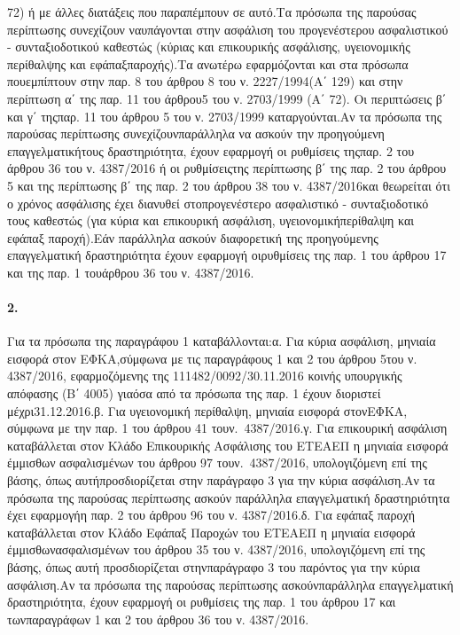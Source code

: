 \documentclass[a4paper,oneside, 10pt]{book}
\begin{document}
72) ή με άλλες διατάξεις που παραπέμπουν σε αυτό.Τα πρόσωπα της παρούσας περίπτωσης συνεχίζουν ναυπάγονται στην ασφάλιση του προγενέστερου ασφαλιστικού - συνταξιοδοτικού καθεστώς (κύριας και επικουρικής ασφάλισης, υγειονομικής περίθαλψης και εφάπαξπαροχής).Τα ανωτέρω εφαρμόζονται και στα πρόσωπα πουεμπίπτουν στην παρ. 8 του άρθρου 8 του ν. 2227/1994(Α΄ 129) και στην περίπτωση α΄ της παρ. 11 του άρθρου5 του ν. 2703/1999 (Α΄ 72). Οι περιπτώσεις β΄ και γ΄ τηςπαρ. 11 του άρθρου 5 του ν. 2703/1999 καταργούνται.Αν τα πρόσωπα της παρούσας περίπτωσης συνεχίζουνπαράλληλα να ασκούν την προηγούμενη επαγγελματικήτους δραστηριότητα, έχουν εφαρμογή οι ρυθμίσεις τηςπαρ. 2 του άρθρου 36 του ν. 4387/2016 ή οι ρυθμίσειςτης περίπτωσης β΄ της παρ. 2 του άρθρου 5 και της περίπτωσης β΄ της παρ. 2 του άρθρου 38 του ν. 4387/2016και θεωρείται ότι ο χρόνος ασφάλισης έχει διανυθεί στοπρογενέστερο ασφαλιστικό - συνταξιοδοτικό τους καθεστώς (για κύρια και επικουρική ασφάλιση, υγειονομικήπερίθαλψη και εφάπαξ παροχή).Εάν παράλληλα ασκούν διαφορετική της προηγούμενης επαγγελματική δραστηριότητα έχουν εφαρμογή οιρυθμίσεις της παρ. 1 του άρθρου 17 και της παρ. 1 τουάρθρου 36 του ν. 4387/2016.
\paragraph { 2. } Για τα πρόσωπα της παραγράφου 1 καταβάλλονται:α. Για κύρια ασφάλιση, μηνιαία εισφορά στον ΕΦΚΑ,σύμφωνα με τις παραγράφους 1 και 2 του άρθρου 5του ν. 4387/2016, εφαρμοζόμενης της 111482/0092/30.11.2016 κοινής υπουργικής απόφασης (Β΄ 4005) γιαόσα από τα πρόσωπα της παρ. 1 έχουν διοριστεί μέχρι31.12.2016.β. Για υγειονομική περίθαλψη, μηνιαία εισφορά στονΕΦΚΑ, σύμφωνα με την παρ. 1 του άρθρου 41 τουν. 4387/2016.γ. Για επικουρική ασφάλιση καταβάλλεται στον Κλάδο Επικουρικής Ασφάλισης του ΕΤΕΑΕΠ η μηνιαία εισφορά έμμισθων ασφαλισμένων του άρθρου 97 τουν. 4387/2016, υπολογιζόμενη επί της βάσης, όπως αυτήπροσδιορίζεται στην παράγραφο 3 για την κύρια ασφάλιση.Αν τα πρόσωπα της παρούσας περίπτωσης ασκούν παράλληλα επαγγελματική δραστηριότητα έχει εφαρμογήη παρ. 2 του άρθρου 96 του ν. 4387/2016.δ. Για εφάπαξ παροχή καταβάλλεται στον Κλάδο Εφάπαξ Παροχών του ΕΤΕΑΕΠ η μηνιαία εισφορά έμμισθωνασφαλισμένων του άρθρου 35 του ν. 4387/2016, υπολογιζόμενη επί της βάσης, όπως αυτή προσδιορίζεται στηνπαράγραφο 3 του παρόντος για την κύρια ασφάλιση.Αν τα πρόσωπα της παρούσας περίπτωσης ασκούνπαράλληλα επαγγελματική δραστηριότητα, έχουν εφαρμογή οι ρυθμίσεις της παρ. 1 του άρθρου 17 και τωνπαραγράφων 1 και 2 του άρθρου 36 του ν. 4387/2016.
\end{document}
